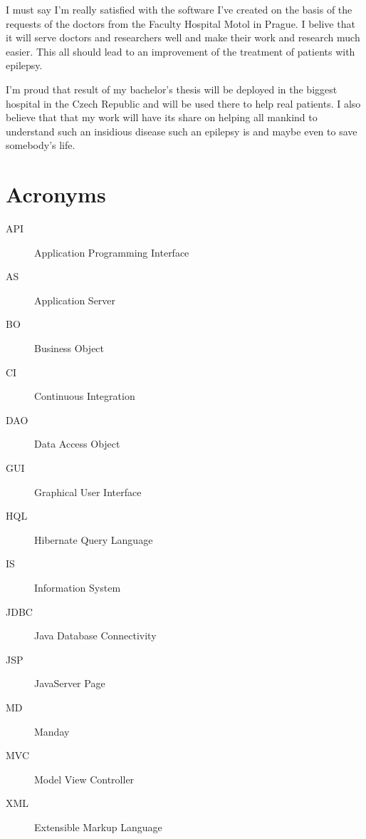 \documentclass[thesis=B,english]{FITthesis}[2012/10/20]
\begin{document}
\begin{conclusion}
I must say I'm really satisfied with the software I've created on the basis of the requests of the doctors from the Faculty Hospital Motol in Prague. I belive that it will serve doctors and researchers well and make their work and research much easier. This all should lead to an improvement of the treatment of patients with epilepsy.

I'm proud that result of my bachelor's thesis will be deployed in the biggest hospital in the Czech Republic and will be used there to help real patients. I also believe that that my work will have its share on helping all mankind to understand such an insidious disease such an epilepsy is and maybe even to save somebody's life.

\end{conclusion}




\appendix

\chapter{Acronyms}
\begin{description}
	\item[API] Application Programming Interface
	\item[AS] Application Server
	\item[BO] Business Object
	\item[CI] Continuous Integration
	\item[DAO] Data Access Object
	\item[GUI] Graphical User Interface
	\item[HQL] Hibernate Query Language
	\item[IS] Information System
	\item[JDBC] Java Database Connectivity
	\item[JSP] JavaServer Page
	\item[MD] Manday
	\item[MVC] Model View Controller
	\item[XML] Extensible Markup Language
\end{description}
\end{document}
